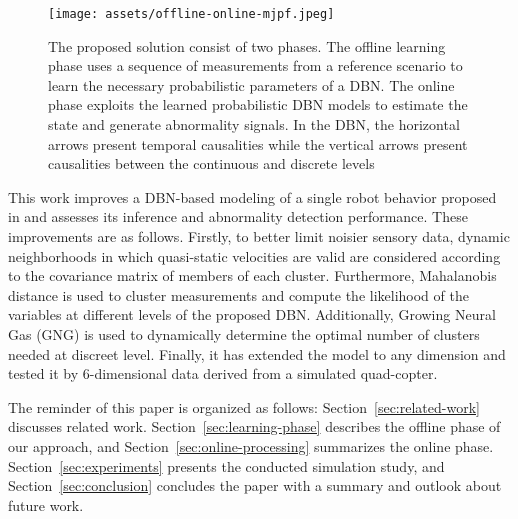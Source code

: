 \documentclass{article}
\begin{document}
\begin{multicols}{2}
    \begin{figure*}[]
        \centering
        \texttt{[image: assets/offline-online-mjpf.jpeg]}
        \caption{The proposed solution consist of two phases. The offline learning phase uses a sequence of measurements from a reference scenario to learn the necessary probabilistic parameters of a DBN. The online phase exploits the learned probabilistic DBN models to estimate the state and generate abnormality signals. In the DBN, the horizontal arrows present temporal causalities while the vertical arrows present causalities between the continuous and discrete levels}
        \label{fig:mjpf}
    \end{figure*} 
    
    This work improves a DBN-based modeling of a single robot behavior proposed in \cite{baydoun-2018-learning-switching-models-for-abnormality-detection-for-autonomous-driving} and assesses its inference and abnormality detection performance. These improvements are as follows. Firstly, to better limit noisier sensory data, dynamic neighborhoods in which quasi-static velocities are valid are considered according to the covariance matrix of members of each cluster. Furthermore, Mahalanobis distance is used to cluster measurements and compute the likelihood of the variables at different levels of the proposed DBN. Additionally, Growing Neural Gas (GNG) is used to dynamically determine the optimal number of clusters needed at discreet level. Finally, it has extended the model to any dimension and tested it by 6-dimensional data derived from a simulated quad-copter. 
    
    The reminder of this paper is organized as follows: Section~\ref{sec:related-work} discusses related work. Section~\ref{sec:learning-phase} describes the offline phase of our approach, and Section~\ref{sec:online-processing} summarizes the online phase. Section~\ref{sec:experiments} presents the conducted simulation study, and Section~\ref{sec:conclusion} concludes the paper with a summary and outlook about future work.
    

\end{multicols}
\end{document}
